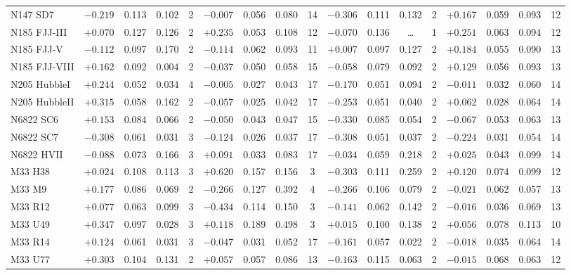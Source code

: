 \documentclass{aa}
\begin{document}
\begin{appendix}
\begin{table*}
\begin{adjustbox}{width=1\textwidth}
{\begin{tabular}{l cccccccccccccccc}
N147 SD7      & $-0.219$ & 0.113 & 0.102 & 2 & $-0.007$ & 0.056 & 0.080 & 14 & $-0.306$ & 0.111 & 0.132 & 2 & $+0.167$ & 0.059 & 0.093 & 12 \\
N185 FJJ-III  & $+0.070$ & 0.127 & 0.126 & 2 & $+0.235$ & 0.053 & 0.108 & 12 & $-0.070$ & 0.136 & \ldots & 1 & $+0.251$ & 0.063 & 0.094 & 12 \\
N185 FJJ-V    & $-0.112$ & 0.097 & 0.170 & 2 & $-0.114$ & 0.062 & 0.093 & 11 & $+0.007$ & 0.097 & 0.127 & 2 & $+0.184$ & 0.055 & 0.090 & 13 \\
N185 FJJ-VIII & $+0.162$ & 0.092 & 0.004 & 2 & $-0.037$ & 0.050 & 0.058 & 15 & $-0.058$ & 0.079 & 0.092 & 2 & $+0.129$ & 0.056 & 0.093 & 13 \\
N205 HubbleI  & $+0.244$ & 0.052 & 0.034 & 4 & $-0.005$ & 0.027 & 0.043 & 17 & $-0.170$ & 0.051 & 0.094 & 2 & $-0.011$ & 0.032 & 0.060 & 14 \\
N205 HubbleII & $+0.315$ & 0.058 & 0.162 & 2 & $-0.057$ & 0.025 & 0.042 & 17 & $-0.253$ & 0.051 & 0.040 & 2 & $+0.062$ & 0.028 & 0.064 & 14 \\
N6822 SC6     & $+0.153$ & 0.084 & 0.066 & 2 & $-0.050$ & 0.043 & 0.047 & 15 & $-0.330$ & 0.085 & 0.054 & 2 & $-0.067$ & 0.053 & 0.063 & 13 \\
N6822 SC7     & $-0.308$ & 0.061 & 0.031 & 3 & $-0.124$ & 0.026 & 0.037 & 17 & $-0.308$ & 0.051 & 0.037 & 2 & $-0.224$ & 0.031 & 0.054 & 14 \\
N6822 HVII    & $-0.088$ & 0.073 & 0.166 & 3 & $+0.091$ & 0.033 & 0.083 & 17 & $-0.034$ & 0.059 & 0.218 & 2 & $+0.025$ & 0.043 & 0.099 & 14 \\
M33 H38       & $+0.024$ & 0.108 & 0.113 & 3 & $+0.620$ & 0.157 & 0.156 & 3 & $-0.303$ & 0.111 & 0.259 & 2 & $+0.120$ & 0.074 & 0.099 & 12 \\
M33 M9        & $+0.177$ & 0.086 & 0.069 & 2 & $-0.266$ & 0.127 & 0.392 & 4 & $-0.266$ & 0.106 & 0.079 & 2 & $-0.021$ & 0.062 & 0.057 & 13 \\
M33 R12       & $+0.077$ & 0.063 & 0.099 & 3 & $-0.434$ & 0.114 & 0.150 & 3 & $-0.141$ & 0.062 & 0.142 & 2 & $-0.016$ & 0.036 & 0.069 & 13 \\
M33 U49       & $+0.347$ & 0.097 & 0.028 & 3 & $+0.118$ & 0.189 & 0.498 & 3 & $+0.015$ & 0.100 & 0.138 & 2 & $+0.056$ & 0.078 & 0.113 & 10 \\
M33 R14       & $+0.124$ & 0.061 & 0.031 & 3 & $-0.047$ & 0.031 & 0.052 & 17 & $-0.161$ & 0.057 & 0.022 & 2 & $-0.018$ & 0.035 & 0.064 & 14 \\
M33 U77       & $+0.303$ & 0.104 & 0.131 & 2 & $+0.057$ & 0.057 & 0.086 & 13 & $-0.163$ & 0.115 & 0.063 & 2 & $-0.015$ & 0.068 & 0.063 & 12 \\

\end{tabular}}
\end{adjustbox}
\end{table*}
\end{appendix}
\end{document}
